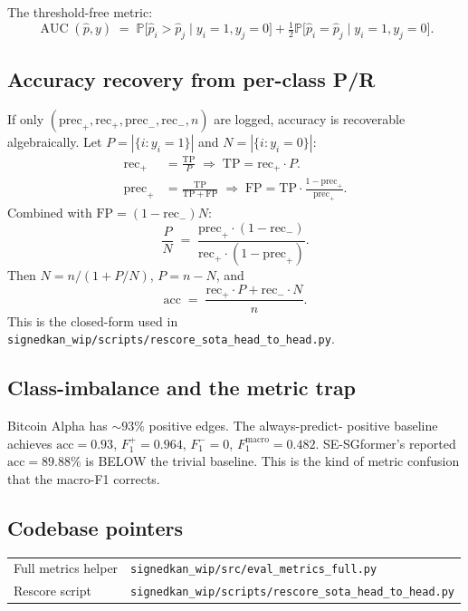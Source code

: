 \documentclass[11pt,a4paper]{article}
\theoremstyle{remark}
\DeclareMathOperator{\AUC}{AUC}
\newcommand{\Prob}{\mathbb{P}}
\begin{document}
The threshold-free metric:
\[
  \AUC(\hat p, y) \;=\;
    \Prob\!\bigl[\hat p_i > \hat p_j \mid y_i = 1, y_j = 0\bigr]
    + \tfrac{1}{2}\Prob\!\bigl[\hat p_i = \hat p_j \mid y_i = 1, y_j = 0\bigr].
\]

\subsection{Accuracy recovery from per-class P/R}\label{ssec:accuracy-recovery}

If only $(\mathrm{prec}_+, \mathrm{rec}_+, \mathrm{prec}_-, \mathrm{rec}_-, n)$
are logged, accuracy is recoverable algebraically. Let
$P = |\{i : y_i = 1\}|$ and $N = |\{i : y_i = 0\}|$:
\begin{align*}
  \mathrm{rec}_+ &= \frac{\mathrm{TP}}{P}              \;\Rightarrow\; \mathrm{TP} = \mathrm{rec}_+ \cdot P. \\
  \mathrm{prec}_+ &= \frac{\mathrm{TP}}{\mathrm{TP} + \mathrm{FP}} \;\Rightarrow\; \mathrm{FP} = \mathrm{TP} \cdot \frac{1 - \mathrm{prec}_+}{\mathrm{prec}_+}.
\end{align*}
Combined with $\mathrm{FP} = (1 - \mathrm{rec}_-) N$:
\[
  \frac{P}{N} \;=\;
    \frac{\mathrm{prec}_+ \cdot (1 - \mathrm{rec}_-)}{\mathrm{rec}_+ \cdot (1 - \mathrm{prec}_+)}.
\]
Then $N = n / (1 + P/N)$, $P = n - N$, and
\[
  \mathrm{acc} \;=\; \frac{\mathrm{rec}_+ \cdot P + \mathrm{rec}_- \cdot N}{n}.
\]
This is the closed-form used in
\texttt{signedkan\_wip/scripts/rescore\_sota\_head\_to\_head.py}.

\subsection{Class-imbalance and the metric trap}

Bitcoin Alpha has $\sim 93\%$ positive edges. The always-predict-
positive baseline achieves $\mathrm{acc} = 0.93$,
$F_1^+ = 0.964$, $F_1^- = 0$, $F_1^{\text{macro}} = 0.482$. SE-SGformer's
reported $\mathrm{acc} = 89.88\%$ is BELOW the trivial baseline.
This is the kind of metric confusion that the macro-F1 corrects.

\subsection{Codebase pointers}

\begin{tabular}{ll}
Full metrics helper & \texttt{signedkan\_wip/src/eval\_metrics\_full.py} \\
Rescore script & \texttt{signedkan\_wip/scripts/rescore\_sota\_head\_to\_head.py} \\
\end{tabular}
\end{document}
